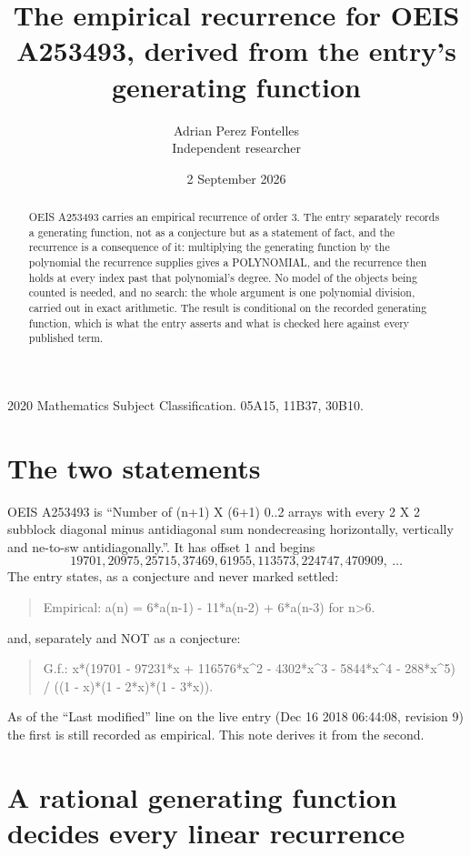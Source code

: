 \documentclass[11pt,a4paper]{article}
\title{The empirical recurrence for OEIS A253493, derived from the entry's generating function}
\author{Adrian Perez Fontelles\\ \small Independent researcher}
\date{2 September 2026}
\theoremstyle{plain}
\theoremstyle{definition}
\begin{document}
\maketitle

\begin{abstract}
OEIS A253493 carries an empirical recurrence of order $3$. The entry separately records a
generating function, not as a conjecture but as a statement of fact, and the recurrence is a
consequence of it: multiplying the generating function by the polynomial the recurrence
supplies gives a POLYNOMIAL, and the recurrence then holds at every index past that
polynomial's degree. No model of the objects being counted is needed, and no search: the
whole argument is one polynomial division, carried out in exact arithmetic. The result is
conditional on the recorded generating function, which is what the entry asserts and what is
checked here against every published term.
\end{abstract}

\noindent\small 2020 Mathematics Subject Classification. 05A15, 11B37, 30B10.\normalsize

\section{The two statements}

OEIS A253493 is ``Number of (n+1) X (6+1) 0..2 arrays with every 2 X 2 subblock diagonal minus antidiagonal sum nondecreasing horizontally, vertically and ne-to-sw antidiagonally.''. It has offset $1$ and begins
\[
19701, 20975, 25715, 37469, 61955, 113573, 224747, 470909,\ \dots
\]
The entry states, as a conjecture and never marked settled:
\begin{quote}
Empirical: a(n) = 6*a(n-1) - 11*a(n-2) + 6*a(n-3) for n>6.
\end{quote}
and, separately and NOT as a conjecture:
\begin{quote}
G.f.: x*(19701 - 97231*x + 116576*x\^{}2 - 4302*x\^{}3 - 5844*x\^{}4 - 288*x\^{}5) / ((1 - x)*(1 - 2*x)*(1 - 3*x)).
\end{quote}
As of the ``Last modified'' line on the live entry (Dec 16 2018 06:44:08, revision 9) the first is still
recorded as empirical. This note derives it from the second.

\section{A rational generating function decides every linear recurrence}
\end{document}

